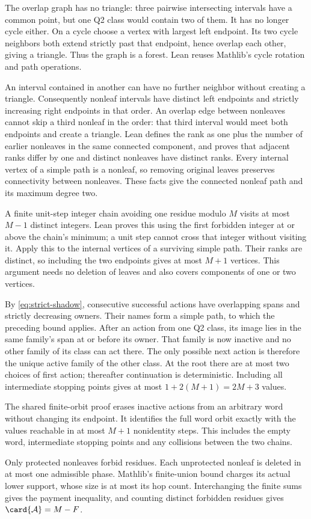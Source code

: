 \begin{outline}
The overlap graph has no triangle: three pairwise intersecting intervals
have a common point, but one Q2 class would contain two of them. It has
no longer cycle either. On a cycle choose a vertex with largest left
endpoint. Its two cycle neighbors both extend strictly past that
endpoint, hence overlap each other, giving a triangle. Thus the graph
is a forest. Lean reuses Mathlib's cycle rotation and path operations.

An interval contained in another can have no further neighbor without
creating a triangle. Consequently nonleaf intervals have distinct left
endpoints and strictly increasing right endpoints in that order. An
overlap edge between nonleaves cannot skip a third nonleaf in the order:
that third interval would meet both endpoints and create a triangle.
Lean defines the rank as one plus the number of earlier nonleaves in
the same connected component, and proves that adjacent ranks differ
by one and distinct nonleaves have distinct ranks. Every internal vertex
of a simple path is a nonleaf, so removing original leaves preserves
connectivity between nonleaves. These facts give the connected nonleaf
path and its maximum degree two.

A finite unit-step integer chain avoiding one residue modulo $M$ visits
at most $M-1$ distinct integers. Lean proves this using the first forbidden
integer at or above the chain's minimum; a unit step cannot cross that
integer without visiting it. Apply this to the internal vertices of a
surviving simple path. Their ranks are distinct, so including the two
endpoints gives at most $M+1$ vertices. This argument needs no deletion
of leaves and also covers components of one or two vertices.

By \eqref{eq:strict-shadow}, consecutive successful actions have
overlapping spans and strictly decreasing owners. Their names form a
simple path, to which the preceding bound applies.
After an action from one Q2 class, its image lies in the same family's
span at or before its owner. That family is now inactive and no other
family of its class can act there. The only possible next action is
therefore the unique active family of the other class. At the root
there are at most two choices of first action; thereafter continuation
is deterministic. Including all intermediate stopping points gives
at most $1+2(M+1)=2M+3$ values.

The shared finite-orbit proof erases inactive actions from an arbitrary
word without changing its endpoint. It identifies the full word orbit
exactly with the values reachable in at most $M+1$ nonidentity steps.
This includes the empty word, intermediate stopping points and any
collisions between the two chains.

Only protected nonleaves forbid residues. Each unprotected nonleaf is
deleted in at most one admissible phase. Mathlib's finite-union bound
charges its actual lower support, whose size is at most its hop count.
Interchanging the finite sums gives the payment inequality, and counting
distinct forbidden residues gives $\card{\mathcal A}=M-F$.
\end{outline}

